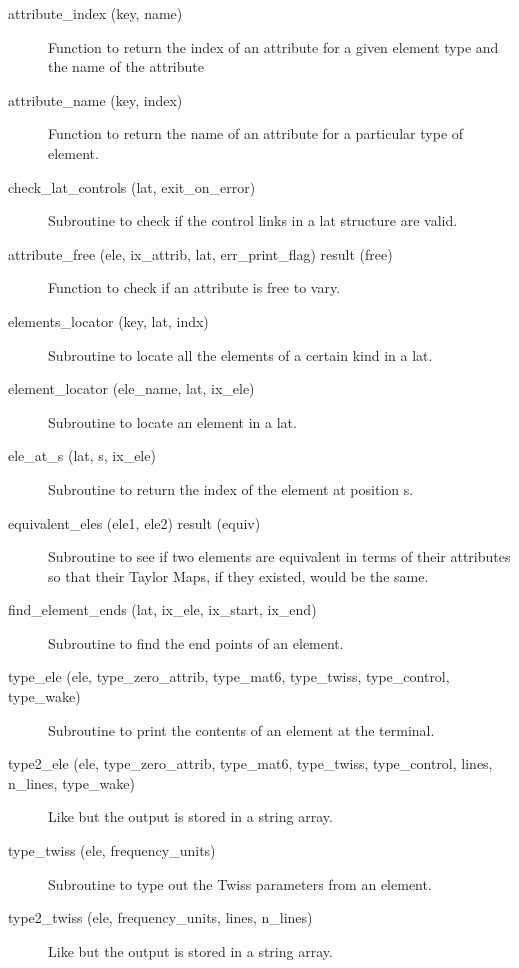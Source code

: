 \begin{description}

\item[attribute_index (key, name)] \Newline
Function to return the index of an attribute for a given element 
type and the name of the attribute 

\item[attribute_name (key, index)] \Newline
Function to return the name of an attribute for a particular type of element. 

\item[check_lat_controls (lat, exit_on_error)] \Newline
Subroutine to check if the control links in a lat structure are valid. 

\item[attribute_free (ele, ix_attrib, lat, err_print_flag) result (free)] \Newline
Function to check if an attribute is free to vary.

\item[elements_locator (key, lat, indx)] \Newline
Subroutine to locate all the elements of a certain kind in a lat. 

\item[element_locator (ele_name, lat, ix_ele)] \Newline
Subroutine to locate an element in a lat. 

\item[ele_at_s (lat, s, ix_ele)] \Newline 
Subroutine to return the index of the element at position s.

\item[equivalent_eles (ele1, ele2) result (equiv)] \Newline 
Subroutine to see if two elements are equivalent in terms of their attributes so
that their Taylor Maps, if they existed, would be the same.

\item[find_element_ends (lat, ix_ele, ix_start, ix_end)] \Newline
Subroutine to find the end points of an element. 

\item[type_ele (ele, type_zero_attrib, type_mat6, type_twiss, 
type_control, type_wake)] \Newline
Subroutine to print the contents of an element at the terminal. 

\item[type2_ele (ele, type_zero_attrib, type_mat6, type_twiss, 
type_control, lines, n_lines, type_wake)] \Newline
Like  but the output is stored in a string array. 

\item[type_twiss (ele, frequency_units)] \Newline
Subroutine to type out the Twiss parameters from an element. 

\item[type2_twiss (ele, frequency_units, lines, n_lines)] \Newline
Like  but the output is stored in a string array. 

\end{description}

